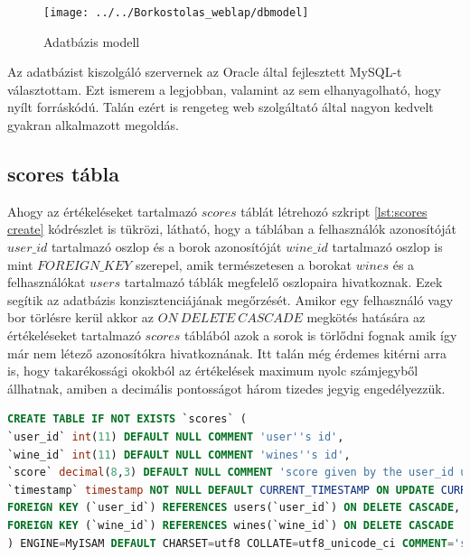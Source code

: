 \documentclass[12pt]{report}
\theoremstyle{definition}
\begin{document}
	\begin{figure}[!ht]
		\centering
		\texttt{[image: ../../Borkostolas\_weblap/dbmodel]}
		\caption[Adatbázis modell]{Adatbázis modell \label{fig:dbmodel}}
	\end{figure}
	
	Az adatbázist kiszolgáló szervernek az Oracle által fejlesztett MySQL-t választottam. Ezt ismerem a legjobban, valamint az sem elhanyagolható, hogy nyílt forráskódú. Talán ezért is rengeteg web szolgáltató által nagyon kedvelt gyakran alkalmazott megoldás. 
	
	\subsection{scores tábla}
	
	Ahogy az értékeléseket tartalmazó $scores$ táblát létrehozó szkript  \ref{lst:scores create} kódrészlet is tükrözi, látható, hogy a táblában a felhasználók azonosítóját $user\_id$ tartalmazó oszlop és a borok azonosítóját $wine\_id$ tartalmazó oszlop is mint $FOREIGN\_KEY$ szerepel, amik természetesen a borokat $wines$ és a felhasználókat $users$ tartalmazó táblák megfelelő oszlopaira hivatkoznak. Ezek segítik az adatbázis konzisztenciájának megőrzését. Amikor egy felhasználó vagy bor törlésre kerül akkor az $ON\ DELETE\ CASCADE$ megkötés hatására az értékeléseket tartalmazó $scores$ táblából azok a sorok is törlődni fognak amik így már nem létező azonosítókra hivatkoznának. Itt talán még érdemes kitérni arra is, hogy takarékossági okokból az értékelések maximum nyolc számjegyből állhatnak, amiben a decimális pontosságot három tizedes jegyig engedélyezzük. 

 	
	\noindent\noindent\begin{minipage}{\linewidth}
		\begin{lstlisting}[language=sql,label={lst:scores create}, caption={Az értékeléseket tartalmazó ($scores$) táblát létrehozó parancs}]
CREATE TABLE IF NOT EXISTS `scores` (
`user_id` int(11) DEFAULT NULL COMMENT 'user''s id',
`wine_id` int(11) DEFAULT NULL COMMENT 'wines''s id',
`score` decimal(8,3) DEFAULT NULL COMMENT 'score given by the user_id user for the wine_id wine',
`timestamp` timestamp NOT NULL DEFAULT CURRENT_TIMESTAMP ON UPDATE CURRENT_TIMESTAMP,
FOREIGN KEY (`user_id`) REFERENCES users(`user_id`) ON DELETE CASCADE,
FOREIGN KEY (`wine_id`) REFERENCES wines(`wine_id`) ON DELETE CASCADE
) ENGINE=MyISAM DEFAULT CHARSET=utf8 COLLATE=utf8_unicode_ci COMMENT='score data';
		\end{lstlisting}
	\end{minipage}
	
\end{document}
